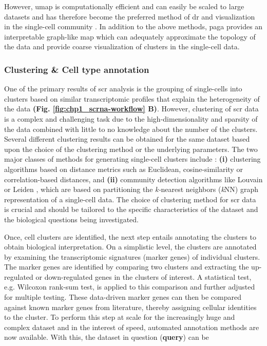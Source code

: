 However, \gls{umap} is computationally efficient and can easily be scaled to large datasets and has therefore become the preferred method of \gls{dr} and visualization in the single-cell community \textbf{\cite{kobak_initialization_2021,becht_dimensionality_2018}}. In addition to the above methods, \gls{paga} \textbf{\cite{wolf_paga_2019}} provides an interpretable graph-like map which can adequately approximate the topology of the data and provide coarse visualization of clusters in the single-cell data.

\subsubsection{Clustering \& Cell type annotation}
One of the primary results of \gls{scr} analysis is the grouping of single-cells into clusters based on similar transcriptomic profiles that explain the heterogeneity of the data \textbf{(Fig. \ref{fig:chp1_scrna-workflow} B)}. However, clustering of \gls{scr} data is a complex and challenging task due to the high-dimensionality and sparsity of the data combined with little to no knowledge about the number of the clusters. Several different clustering results can be obtained for the same dataset based upon the choice of the clustering method or the underlying parameters. %
The two major classes of methods for generating single-cell clusters include : \textbf{(i)} clustering algorithms based on distance metrics such as Euclidean, cosine-similarity or correlation-based distances, and \textbf{(ii)} community detection algorithms like Louvain \textbf{\cite{blondel_fast_2008}} or Leiden \textbf{\cite{traag_louvain_2019}}, which are based on partitioning the \textit{k-}nearest neighbors (\textit{k}NN) graph representation of a single-cell data. The choice of clustering method for \gls{scr} data is crucial and should be tailored to the specific characteristics of the dataset and the biological questions being investigated.\\

\par Once, cell clusters are identified, the next step entails annotating the clusters to obtain biological interpretation. On a simplistic level, the clusters are annotated by examining the transcriptomic signatures (marker genes) of individual clusters. The marker genes are identified by comparing two clusters and extracting the up-regulated or down-regulated genes in the clusters of interest. A statistical test, e.g. Wilcoxon rank-sum test, is applied to this comparison and further adjusted for multiple testing. These data-driven marker genes can then be compared against known marker genes from literature, thereby assigning cellular identities to the cluster. To perform this step at scale for the increasingly huge and complex dataset and in the interest of speed, automated annotation methods are now available. With this, the dataset in question (\textbf{query}) can be

